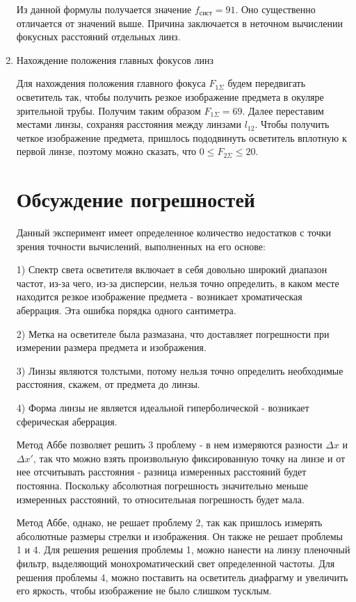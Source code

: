 \documentclass[a4paper,12pt]{article}
\renewcommand{\leq}{\ensuremath{\leqslant}}
\theoremstyle{plain} %
\theoremstyle{definition} %
\theoremstyle{remark} %
\begin{document}
\begin{enumerate}
Из данной формулы получается значение $f_\text{сист} = 91$. Оно существенно отличается от значений выше. Причина заключается в неточном вычислении фокусных расстояний отдельных линз.

\item Нахождение положения главных фокусов линз

Для нахождения положения главного фокуса $F_{1\Sigma}$ будем передвигать осветитель так, чтобы получить резкое изображение предмета в окуляре зрительной трубы. Получим таким образом $F_{1\Sigma} = 69$. Далее переставим местами линзы, сохраняя расстояния между линзами $l_{12}$. Чтобы получить четкое изображение предмета, пришлось пододвинуть осветитель вплотную к первой линзе, поэтому можно сказать, что $0 \leq F_{2\Sigma} \leq 20$.

\section{Обсуждение погрешностей}

Данный эксперимент имеет определенное количество недостатков с точки зрения точности вычислений, выполненных на его основе:

1) Спектр света осветителя включает в себя довольно широкий диапазон частот, из-за чего, из-за дисперсии, нельзя точно определить, в каком месте находится резкое изображение предмета - возникает хроматическая аберрация. Эта ошибка порядка одного сантиметра.

2) Метка на осветителе была размазана, что доставляет погрешности при измерении размера предмета и изображения.

3) Линзы являются толстыми, потому нельзя точно определить необходимые расстояния, скажем, от предмета до линзы.

4) Форма линзы не является идеальной гиперболической - возникает сферическая аберрация.



Метод Аббе позволяет решить 3 проблему - в нем измеряются разности $\Delta{}x$ и $\Delta{}x'$, так что можно взять произвольную фиксированную точку на линзе и от нее отсчитывать расстояния - разница измеренных расстояний будет постоянна. Поскольку абсолютная погрешность значительно меньше измеренных расстояний, то относительная погрешность будет мала.



Метод Аббе, однако, не решает проблему 2, так как пришлось измерять абсолютные размеры стрелки и изображения. Он также не решает проблемы 1 и 4. Для решения решения проблемы 1, можно нанести на линзу пленочный фильтр, выделяющий монохроматический свет определенной частоты. Для решения проблемы 4, можно поставить на осветитель диафрагму и увеличить его яркость, чтобы изображение не было слишком тусклым. 


\end{enumerate}  
\end{document}
